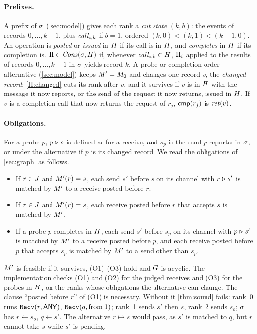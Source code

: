 \paragraph{Prefixes.}
A prefix of $\sigma$ (\cref{sec:model}) gives each rank a \emph{cut state} $(k,b)$: the events of
records $0,\dots,k-1$, plus $\mathit{call}_{i,k}$ if $b=1$, ordered $(k,0)<(k,1)<(k+1,0)$. An
operation is \emph{posted} or \emph{issued} in $H$ if its call is in $H$, and
\emph{completes} in $H$ if its completion is. $\Pi\in\mathit{Cons}(\sigma,H)$ if, whenever
$\mathit{call}_{i,k}\in H$, $\Pi_i$ applied to the results of records $0,\dots,k-1$ in $\sigma$
yields record $k$. A probe or completion-order alternative (\cref{sec:model}) keeps $M'=M_0$ and changes
one record $v$, the \emph{changed record}: \ref{H:changed} cuts its rank after $v$, and it
survives if $v$ is in $H$ with the message it now reports, or the send of the request it now
returns, issued in $H$. If $v$ is a completion call that now returns the request of $r_j$,
$\mathsf{cmp}(r_j)$ is $\mathit{ret}(v)$.

\paragraph{Obligations.}
For a probe $p$, $p\mathrel{\triangleright} s$ is defined as for a receive, and $s_p$ is the send $p$ reports:
in $\sigma$, or under the alternative if $p$ is its changed record. We read the obligations of
\cref{sec:graph} as follows.
\begin{itemize}[leftmargin=*]
\item[(O1)] If $r\in J$ and $M'(r)=s$, each send $s'$ before $s$ on its channel with
  $r\mathrel{\triangleright} s'$ is matched by $M'$ to a receive posted before $r$.
\item[(O2)] If $r\in J$ and $M'(r)=s$, each receive posted before $r$ that accepts $s$
  is matched by $M'$.
\item[(O3)] If a probe $p$ completes in $H$, each send $s'$ before $s_p$ on its channel
  with $p\mathrel{\triangleright} s'$ is matched by $M'$ to a receive posted before $p$, and each receive
  posted before $p$ that accepts $s_p$ is matched by $M'$ to a send other than $s_p$.
\end{itemize}
$M'$ is feasible if it survives, (O1)--(O3) hold and $G$ is acyclic. The
implementation checks (O1) and (O2) for the judged receives and (O3) for the probes in $H$,
on the ranks whose obligations the alternative can change. The clause ``posted before $r$'' of (O1) is necessary. Without it \cref{thm:sound} fails: rank~0
runs $\texttt{Recv}(r,\textsf{ANY})$, $\texttt{Recv}(q,\text{from }1)$; rank~1 sends $s'$ then $s$,
rank~2 sends $s_o$; $\sigma$ has $r\gets s_o$, $q\gets s'$. The alternative $r\mapsto s$ would
pass, as $s'$ is matched to $q$, but $r$ cannot take $s$ while $s'$ is pending.

